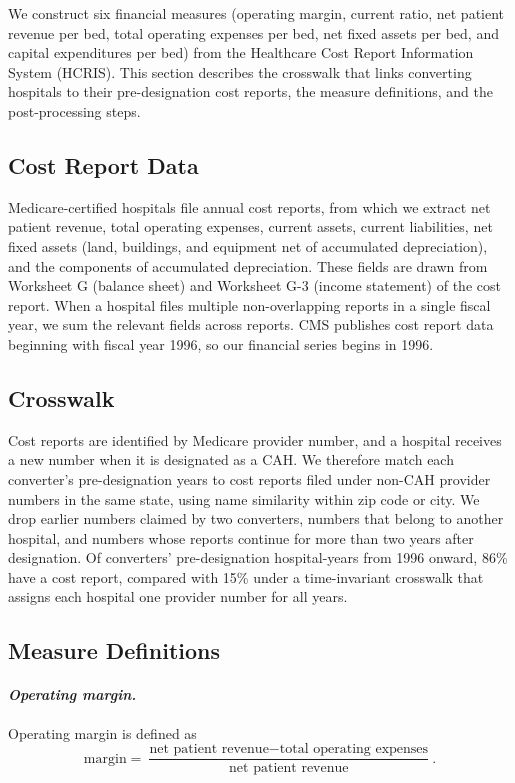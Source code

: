 \documentclass[a4paper, 12pt]{article}
\begin{document}
We construct six financial measures (operating margin, current ratio, net patient revenue per bed, total operating expenses per bed, net fixed assets per bed, and capital expenditures per bed) from the Healthcare Cost Report Information System (HCRIS). This section describes the crosswalk that links converting hospitals to their pre-designation cost reports, the measure definitions, and the post-processing steps.

\subsection{Cost Report Data}

Medicare-certified hospitals file annual cost reports, from which we extract net patient revenue, total operating expenses, current assets, current liabilities, net fixed assets (land, buildings, and equipment net of accumulated depreciation), and the components of accumulated depreciation. These fields are drawn from Worksheet G (balance sheet) and Worksheet G-3 (income statement) of the cost report. When a hospital files multiple non-overlapping reports in a single fiscal year, we sum the relevant fields across reports. CMS publishes cost report data beginning with fiscal year 1996, so our financial series begins in 1996.

\subsection{Crosswalk}

Cost reports are identified by Medicare provider number, and a hospital receives a new number when it is designated as a CAH. We therefore match each converter's pre-designation years to cost reports filed under non-CAH provider numbers in the same state, using name similarity within zip code or city. We drop earlier numbers claimed by two converters, numbers that belong to another hospital, and numbers whose reports continue for more than two years after designation. Of converters' pre-designation hospital-years from 1996 onward, 86\% have a cost report, compared with 15\% under a time-invariant crosswalk that assigns each hospital one provider number for all years.

\subsection{Measure Definitions}

\paragraph{\textit{Operating margin.}} Operating margin is defined as
$$
\text{margin} = \frac{\text{net patient revenue} - \text{total operating expenses}}{\text{net patient revenue}}.
$$
\end{document}
